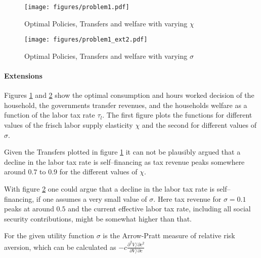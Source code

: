 \begin{figure}[h]
	\centering
			\texttt{[image: figures/problem1.pdf]}
	\caption{Optimal Policies, Transfers and welfare with varying $\chi $}
	\label{fig:problem1}
\end{figure}

\begin{figure}[h]%
\texttt{[image: figures/problem1\_ext2.pdf]}%
\caption{Optimal Policies, Transfers and welfare with varying $\sigma $}%
\label{fig:problem1_ext2}%
\end{figure}

\paragraph{Extensions}
Figures \ref{fig:problem1} and \ref{fig:problem1_ext2} show the optimal
consumption and hours worked decision of the household, the governments
transfer revenues, and the households welfare as a function of the labor tax
rate $\tau_l$. The first figure plots the functions for different values of the
frisch labor supply elasticity $\chi $ and the second for different values of
$\sigma $.

Given the Transfers plotted in figure \ref{fig:problem1} it can not be
plausibly argued that a decline in the labor tax rate is self--financing as tax
revenue peaks somewhere around $0.7$ to $0.9$ for the different values of
$\chi $.

With figure \ref{fig:problem1_ext2} one could argue that a decline in the labor
tax rate is self--financing, if one assumes a very small value of $\sigma
$. Here tax revenue for $\sigma = 0.1$ peaks at around $0.5$ and the current
effective labor tax rate, including all social security contributions, might be
somewhat higher than that.

For the given utility function $\sigma $ is the Arrow-Pratt measure of relative
risk aversion, which can be calculated as $-c \frac{\partial^2 V / \partial
  c^2}{\partial V / \partial c} $


